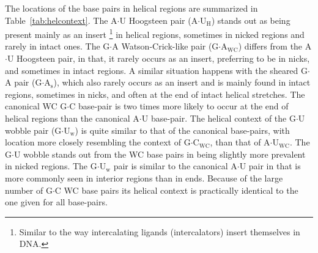 The locations of  the base pairs in helical  regions are summarized in
Table~\ref{tab:helcontext}.     The     A$\cdot$U    Hoogsteen    pair
(A$\cdot$U$_{\text{H}}$)  stands out  as  being present  mainly as  an
insert   \footnote{Similar   to    the   way   intercalating   ligands
  (intercalators)  insert  themselves  in  DNA.} in  helical  regions,
sometimes in nicked  regions and rarely in intact  ones. The G$\cdot$A
Watson-Crick-like  pair  (G$\cdot$A$_{\text{WC}}$)  differs  from  the
A$\cdot$U  Hoogsteen pair,  in that,  it rarely  occurs as  an insert,
preferring to be in nicks,  and sometimes in intact regions. A similar
situation     happens    with     the    sheared     G$\cdot$A    pair
(G$\cdot$A$_{\text{s}}$), which also rarely occurs as an insert and is
mainly found in  intact regions, sometimes in nicks,  and often at the
end of intact helical stretches.  The canonical
WC G$\cdot$C base-pair is two times more likely to occur at the end of
helical regions than the canonical A$\cdot$U base-pair.  The
helical context of  the G$\cdot$U wobble pair (G$\cdot$U$_{\text{w}}$)
is quite similar to that of the canonical base-pairs, with location more closely
resembling  the  context  of  G$\cdot$C$_{\text{WC}}$,  than  that  of
A$\cdot$U$_{\text{WC}}$.  The G$\cdot$U wobble  stands out from the WC
base pairs  in being  slightly more prevalent  in nicked  regions. The
G$\cdot$U$_{\text{w}}$ pair is similar to the canonical A$\cdot$U pair
in that is more commonly seen in
interior  regions  than  in  ends.  Because of  the  large  number  of
G$\cdot$C WC  base pairs its helical context  is practically identical
to the one given for all base-pairs.

